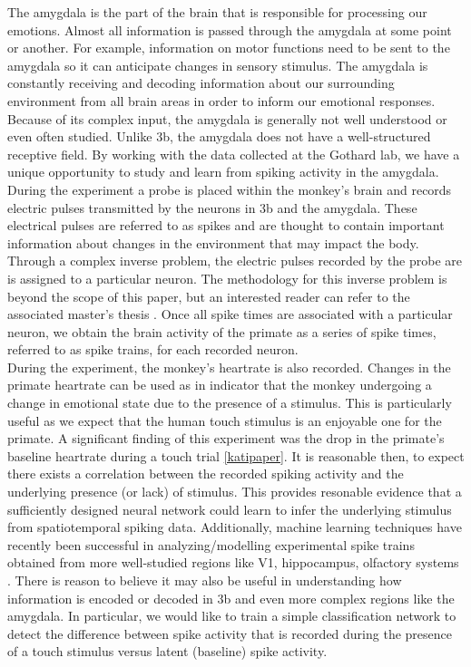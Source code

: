 \documentclass[12pt]{article}
\begin{document}
\indent The amygdala is the part of the brain that is responsible for processing our
emotions. Almost all information is passed through the amygdala at some point or
another. For example, information on motor functions need to be sent to the amygdala
so it can anticipate changes in sensory stimulus. The amygdala is
constantly receiving and decoding information about our surrounding environment from all brain areas in
order to inform our emotional responses. Because of its complex input, the amygdala is generally not well understood or even often studied. Unlike 3b, the amygdala does not have a well-structured receptive field.  By working with the data collected at the Gothard lab,  we have a unique opportunity to study and learn from spiking activity in the amygdala. \\
\indent During the experiment a probe is placed within the monkey's brain and records electric pulses transmitted by the neurons in 3b and the amygdala. These electrical pulses are referred to as spikes and are thought to contain important information about changes in the environment that may impact the body.  Through a complex inverse problem, the electric pulses recorded by the probe are is assigned to a particular
neuron. The methodology for this inverse problem is beyond the scope of this paper,
but an interested reader can refer to the associated master's thesis \cite{thesis}. Once all spike
times are associated with a particular neuron, we obtain the brain activity of the primate
as a series of spike times, referred to as spike trains, for each recorded neuron.  \\
\indent During the experiment, the monkey's heartrate is also recorded. Changes in the primate heartrate can be used as in indicator that the monkey undergoing a change in emotional state due to the presence of a stimulus. This is particularly useful as we expect that the human touch stimulus is an enjoyable one for the primate. A significant finding of this experiment was the drop in the primate's baseline heartrate during a touch trial \ref{katipaper}. It is reasonable then, to expect there exists a correlation between the recorded spiking activity and the underlying presence (or lack) of stimulus. This provides resonable evidence that a sufficiently designed neural network could learn to infer the underlying stimulus from spatiotemporal spiking data. Additionally, machine learning techniques have recently been successful in analyzing/modelling experimental spike trains obtained from more well-studied regions like V1, hippocampus, olfactory systems \cite{laza} \cite{banino} \cite{stevens}. There is reason to believe it may also be useful in understanding how information is encoded or decoded in 3b and even more complex regions like the amygdala. In particular, we would like to train a simple classification network to detect the difference between spike activity that is recorded during the presence of a touch stimulus versus latent (baseline) spike activity. \\
\end{document}

